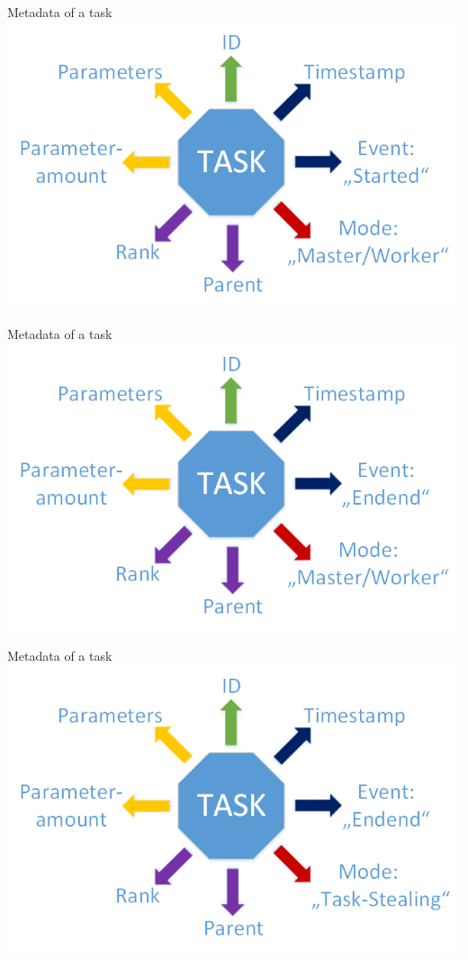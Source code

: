 	\begin{frame}{Metadata of a task}
	\includegraphics[width=1.0\textwidth]{images/Task/Zeichnung2.png}
	\end{frame}
	
	\begin{frame}{Metadata of a task}
	\includegraphics[width=1.0\textwidth]{images/Task/Zeichnung3.png}
	\end{frame}
	
	\begin{frame}{Metadata of a task}
	\includegraphics[width=1.0\textwidth]{images/Zeichnungedited.png}
	\end{frame}
	
